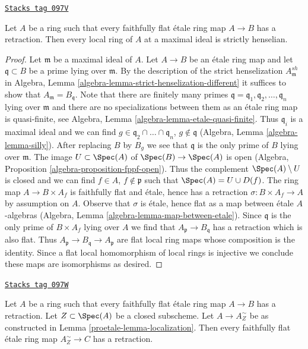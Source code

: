 \begin{lemma}
\label{proetale-lemma-have-sections-strictly-henselian}
\href{https://stacks.math.columbia.edu/tag/097V}{\texttt{Stacks tag 097V}}

Let $A$ be a ring such that every faithfully flat \'etale ring map
$A \to B$ has a retraction. Then every local ring of $A$ at a maximal
ideal is strictly henselian.
\end{lemma}

\begin{proof}
Let $\mathfrak m$ be a maximal ideal of $A$. Let $A \to B$ be an
\'etale ring map and let $\mathfrak q \subset B$ be a prime
lying over $\mathfrak m$. By the description of the strict henselization
$A_\mathfrak m^{sh}$ in
Algebra, Lemma \ref{algebra-lemma-strict-henselization-different}
it suffices to show that $A_\mathfrak m = B_\mathfrak q$.
Note that there are finitely many primes
$\mathfrak q = \mathfrak q_1, \mathfrak q_2, \ldots, \mathfrak q_n$
lying over $\mathfrak m$ and there are no specializations
between them as an \'etale ring map is quasi-finite, see
Algebra, Lemma \ref{algebra-lemma-etale-quasi-finite}.
Thus $\mathfrak q_i$ is a maximal ideal and we can find
$g \in \mathfrak q_2 \cap \ldots \cap \mathfrak q_n$, $g \not \in \mathfrak q$
(Algebra, Lemma \ref{algebra-lemma-silly}).
After replacing $B$ by $B_g$ we see that $\mathfrak q$
is the only prime of $B$ lying over $\mathfrak m$.
The image $U \subset \Spec(A)$ of $\Spec(B) \to \Spec(A)$ is
open (Algebra, Proposition \ref{algebra-proposition-fppf-open}).
Thus the complement $\Spec(A) \setminus U$ is closed
and we can find $f \in A$, $f \not \in \mathfrak p$ such that
$\Spec(A) = U \cup D(f)$. The ring map $A \to B \times A_f$
is faithfully flat and \'etale, hence has a retraction
$\sigma : B \times A_f \to A$ by assumption on $A$.
Observe that $\sigma$ is \'etale, hence flat as a map between \'etale
$A$-algebras (Algebra, Lemma \ref{algebra-lemma-map-between-etale}).
Since $\mathfrak q$ is the only prime of $B \times A_f$ lying
over $A$ we find that $A_\mathfrak p \to B_\mathfrak q$ has
a retraction which is also flat. Thus
$A_\mathfrak p \to B_\mathfrak q \to A_\mathfrak p$
are flat local ring maps whose composition is the identity. Since
a flat local homomorphism of local rings is injective we conclude these
maps are isomorphisms as desired.
\end{proof}

\begin{lemma}
\label{proetale-lemma-have-sections-localize}
\href{https://stacks.math.columbia.edu/tag/097W}{\texttt{Stacks tag 097W}}

Let $A$ be a ring such that every faithfully flat \'etale ring map
$A \to B$ has a retraction. Let $Z \subset \Spec(A)$ be a closed subscheme.
Let $A \to A_Z^\sim$ be as constructed in Lemma \ref{proetale-lemma-localization}.
Then every faithfully flat \'etale ring map $A_Z^\sim \to C$ has
a retraction.
\end{lemma}

